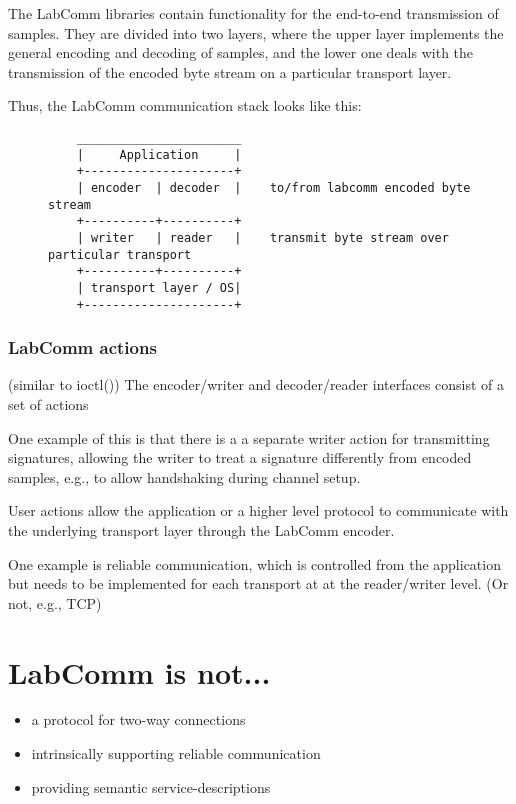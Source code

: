 \documentclass[a4paper]{article}
\begin{document}
The LabComm libraries contain functionality for the end-to-end transmission
of samples. They are divided into two layers, where the upper layer implements
the general encoding and decoding of samples, and the lower one deals with
the transmission of the encoded byte stream on a particular transport layer.

Thus, the LabComm communication stack looks like this:
\begin{figure}[h!]
\begin{verbatim}
    _______________________
    |     Application     |
    +---------------------+
    | encoder  | decoder  |    to/from labcomm encoded byte stream
    +----------+----------+
    | writer   | reader   |    transmit byte stream over particular transport
    +----------+----------+
    | transport layer / OS|
    +---------------------+
\end{verbatim}
\end{figure}
\subsubsection{LabComm actions}

(similar to ioctl())
The encoder/writer and decoder/reader interfaces consist of a set of actions

One example of this is that there is a a separate writer action for
transmitting signatures, allowing the writer to treat a signature differently
from encoded samples, e.g., to allow handshaking during channel setup.

User actions allow the application or a higher level
protocol to communicate with the underlying transport layer through the LabComm
encoder.

One example is reliable communication, which is controlled from the application
but needs to be implemented for each transport at at the reader/writer level.
(Or not, e.g., TCP)

\section{LabComm is not...}

\begin{itemize}
\item a protocol for two-way connections
\item intrinsically supporting reliable communication
\item providing semantic service-descriptions
\end{itemize}
\end{document}
